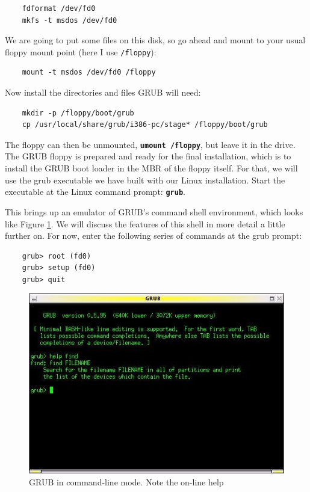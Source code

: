 \documentclass{article}
\begin{document}
\begin{verbatim}
    fdformat /dev/fd0
    mkfs -t msdos /dev/fd0
\end{verbatim}

We are going to put some files on this disk, so go ahead and mount to your usual floppy mount point (here I use \texttt{/floppy}):

\begin{verbatim}
    mount -t msdos /dev/fd0 /floppy
\end{verbatim}

Now install the directories and files GRUB will need:

\begin{verbatim}
    mkdir -p /floppy/boot/grub
    cp /usr/local/share/grub/i386-pc/stage* /floppy/boot/grub
\end{verbatim}

The floppy can then be unmounted, \textbf{\texttt{umount /floppy}}, but leave it in the drive. The GRUB floppy is prepared and ready for the final installation, which is to install the GRUB boot loader in the MBR of the floppy itself. For that, we will use the grub executable we have built with our Linux installation. Start the executable at the Linux command prompt: \textbf{\texttt{grub}}.

This brings up an emulator of GRUB's command shell environment, which looks like Figure \ref{fig:comline}. We will discuss the features of this shell in more detail a little further on. For now, enter the following series of commands at the grub prompt:


\begin{verbatim}
    grub> root (fd0)
    grub> setup (fd0)
    grub> quit
\end{verbatim}

      \begin{figure}
      \centering
      \includegraphics[width=0.8\linewidth]{Boot-with-GRUB_w768.jpg}
      \caption{GRUB in command-line mode. Note the on-line help}
      \label{fig:comline}
      \end{figure}
\end{document}

